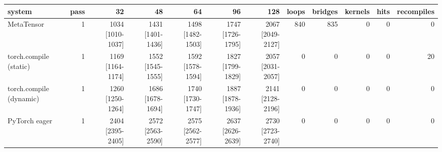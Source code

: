 \begin{tabular}{lrrrrrrrrrrr}
\toprule
system & pass & 32 & 48 & 64 & 96 & 128 & loops & bridges & kernels & hits & recompiles \\
\midrule
MetaTensor & 1 & 1034 [1010-1037] & 1431 [1401-1436] & 1498 [1482-1503] & 1747 [1726-1795] & 2067 [2049-2127] & 840 & 835 & 0 & 0 & 0 \\
torch.compile (static) & 1 & 1169 [1164-1174] & 1552 [1545-1555] & 1592 [1578-1594] & 1827 [1799-1829] & 2057 [2031-2057] & 0 & 0 & 0 & 0 & 20 \\
torch.compile (dynamic) & 1 & 1260 [1250-1264] & 1686 [1678-1694] & 1740 [1730-1747] & 1887 [1878-1936] & 2141 [2128-2196] & 0 & 0 & 0 & 0 & 0 \\
PyTorch eager & 1 & 2404 [2395-2405] & 2572 [2563-2590] & 2575 [2562-2577] & 2637 [2626-2639] & 2730 [2723-2740] & 0 & 0 & 0 & 0 & 0 \\
\bottomrule
\end{tabular}
